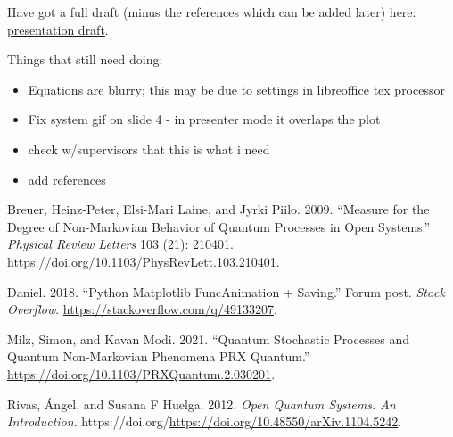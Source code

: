 \documentclass[
  letterpaper,
  DIV=11,
  numbers=noendperiod,
  oneside]{scrartcl}
\newlength{\cslhangindent}
\newenvironment{CSLReferences}[2] %
 {\begin{list}{}{%
  \setlength{\itemindent}{0pt}
  \setlength{\leftmargin}{0pt}
  \setlength{\parsep}{0pt}
  \ifodd #1
   \setlength{\leftmargin}{\cslhangindent}
   \setlength{\itemindent}{-1\cslhangindent}
  \fi
  \setlength{\itemsep}{#2\baselineskip}}}
 {\end{list}}
\providecommand{\tightlist}{%
  \setlength{\itemsep}{0pt}\setlength{\parskip}{0pt}}
\begin{document}
Have got a full draft (minus the references which can be added later)
here:
\href{https://uob-my.sharepoint.com/:p:/g/personal/hx21918_bristol_ac_uk/IQAxHoGUDOXaQ5f2EMPY8mX0ATvUz0yuHUQQV01cOwx3EG4?e=jM7VKp}{presentation
draft}.

Things that still need doing:

\begin{itemize}
\tightlist
\item
  Equations are blurry; this may be due to settings in libreoffice tex
  processor
\item
  Fix system gif on slide 4 - in presenter mode it overlaps the plot
\item
  check w/supervisors that this is what i need
\item
  add references
\end{itemize}

\label{refs}
\begin{CSLReferences}{1}{0}
Breuer, Heinz-Peter, Elsi-Mari Laine, and Jyrki Piilo. 2009. {``Measure
for the {Degree} of {Non}-{Markovian} {Behavior} of {Quantum}
{Processes} in {Open} {Systems}.''} \emph{Physical Review Letters} 103
(21): 210401. \url{https://doi.org/10.1103/PhysRevLett.103.210401}.

Daniel. 2018. {``Python {Matplotlib} {FuncAnimation} + {Saving}.''}
Forum post. \emph{Stack Overflow}.
\url{https://stackoverflow.com/q/49133207}.

Milz, Simon, and Kavan Modi. 2021. {``Quantum {Stochastic} {Processes}
and {Quantum} Non-{Markovian} {Phenomena} {\textbar} {PRX} {Quantum}.''}
\url{https://doi.org/10.1103/PRXQuantum.2.030201}.

Rivas, Ángel, and Susana F Huelga. 2012. \emph{Open {Quantum} {Systems}.
{An} {Introduction}}.
https://doi.org/\url{https://doi.org/10.48550/arXiv.1104.5242}.

\end{CSLReferences}
\end{document}
